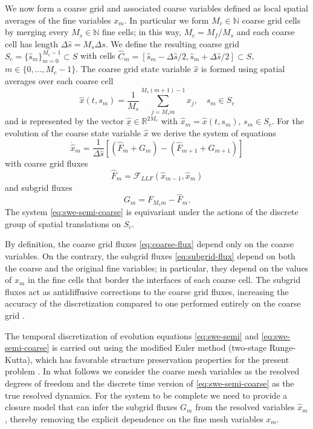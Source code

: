 \documentclass[letterpaper,10pt,3p,preprint]{elsarticle}
\newcommand{\Nbb}{\mathbb{N}}
\newcommand{\Rbb}{\mathbb{R}}
\newcommand{\vect}[1]{\underline{#1}}
\begin{document}
We now form a coarse grid and associated coarse variables defined
as local spatial averages of the fine variables $x_m$.
In particular we form $M_c\in\Nbb$ coarse grid cells by merging every
$M_s\in\Nbb$ fine cells; in this way, $M_c=M_f/M_s$ and each coarse
cell has length $\Delta\hat{s}=M_s\Delta s$.
We define the resulting coarse grid
$S_c=\{\hat{s}_m\}_{m=0}^{M_c-1}\subset S$
with cells
$\hat{C}_m=[\hat{s}_m-\Delta\hat{s}/2,
\hat{s}_m+\Delta\hat{s}/2]\subset S$,
$m\in\{0,\ldots,M_c-1\}$.
The coarse grid state variable $\hat{x}$ is formed
using spatial averages over each coarse cell
\begin{equation*}
    \hat{x}(t,s_m)=\frac{1}{M_s}\sum_{j=M_sm}^{M_s(m+1)-1}x_j,
        \quad s_m\in S_c
\end{equation*}
and is represented by the vector
$\vect{\hat{x}}\in\Rbb^{2M_c}$
with $\hat{x}_m=\hat{x}(t,s_m)$, $s_m\in S_c$.
For the evolution of the coarse state variable $\hat{x}$
we derive the system of equations
\begin{equation}\label{eq:swe-semi-coarse}
    \dot{\hat{x}}_m=\frac{1}{\Delta\hat{s}}
        [(\hat{F}_m+G_m)-(\hat{F}_{m+1}+G_{m+1})]
\end{equation}
with coarse grid fluxes
\begin{equation}\label{eq:coarse-flux}
    \hat{F}_m=\mathcal{F}_{LLF}(\hat{x}_{m-1},\hat{x}_m)
\end{equation}
and subgrid fluxes
\begin{equation}\label{eq:subgrid-flux}
    G_m=F_{M_sm}-\hat{F}_m.
\end{equation}
The system \eqref{eq:swe-semi-coarse} is equivariant under the
actions of the discrete group of spatial translations on $S_c$.

By definition, the coarse grid fluxes \eqref{eq:coarse-flux} depend
only on the coarse variables.
On the contrary, the subgrid fluxes \eqref{eq:subgrid-flux} depend
on both the coarse and the original fine variables;
in particular, they depend on the values of $x_m$
in the fine cells that border the interfaces of each coarse cell.
The subgrid fluxes act as antidiffusive corrections to the coarse
grid fluxes, increasing the accuracy of the discretization compared
to one performed entirely on the coarse grid
\cite{Timofeyev2025}.

The temporal discretization of evolution equations
\eqref{eq:swe-semi} and \eqref{eq:swe-semi-coarse}
is carried out using the modified Euler method
(two-stage Runge-Kutta), which has favorable structure
preservation properties for the present problem
\cite{Timofeyev2025}.
In what follows we consider the coarse mesh variables as the resolved
degrees of freedom and the discrete time version of
\eqref{eq:swe-semi-coarse}
as the true resolved dynamics.
For the system to be complete we need to provide a closure model
that can infer the subgrid fluxes $G_m$ from the resolved variables
$\hat{x}_m$, thereby removing the explicit dependence on the
fine mesh variables $x_m$.
\end{document}
